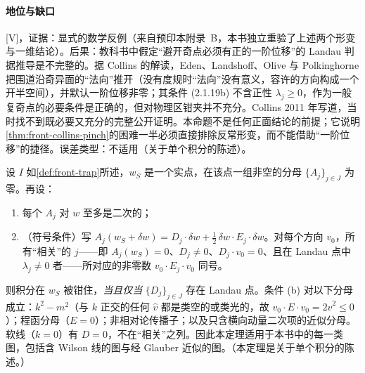 \paragraph{地位与缺口}[V]，证据：显式的数学反例（来自预印本\cite{Collins:2020euz}附录~B，本书独立重验了上述两个形变与一维结论）。后果：教科书中假定“避开奇点必须有正的一阶位移”的 Landau 判据推导是不完整的。据 Collins 的解读\cite[第~IV~节]{Collins:2020euz}，Eden、Landshoff、Olive 与 Polkinghorne\cite[第~2.1~节]{EdenEtAl1966}把围道沿奇异面的“法向”推开（没有度规时“法向”没有意义，容许的方向构成一个开半空间），并默认一阶位移非零；其条件 (2.1.19b) 不含正性 $\lambda_j\ge0$，作为一般复奇点的必要条件是正确的，但对物理区钳夹并不充分。Collins 2011 年写道，当时找不到既必要又充分的完整公开证明\cite[第~5.4.3~节]{Collins2011}。本命题不是任何正面结论的前提；它说明\cref{thm:front-collins-pinch}的困难一半必须直接排除反常形变，而不能借助“一阶位移”的捷径。误差类型：不适用（关于单个积分的陈述）。

\begin{theorem}\label{thm:front-collins-pinch}
设 $I$ 如\cref{def:front-trap}所述，$w_S$ 是一个实点，在该点一组非空的分母 $\{A_j\}_{j\in J}$ 为零。再设：
\begin{enumerate}[label=(\alph*),leftmargin=2.2em,itemsep=0pt,topsep=2pt]
\item 每个 $A_j$ 对 $w$ 至多是二次的；
\item （符号条件）写 $A_j(w_S+\delta w)=D_j\cdot\delta w+\frac12\,\delta w\cdot E_j\cdot\delta w$。对每个方向 $v_0$，所有“相关”的 $j$——即 $A_j(w_S)=0$、$D_j\ne0$、$D_j\cdot v_0=0$、且在 Landau 点中 $\lambda_j\neq0$ 者——所对应的非零数 $v_0\cdot E_j\cdot v_0$ 同号。
\end{enumerate}
则积分在 $w_S$ 被钳住，\emph{当且仅当} $\{D_j\}_{j\in J}$ 存在 Landau 点。条件 (b) 对以下分母成立：$k^2-m^2$（与 $k$ 正交的任何 $\hat v$ 都是类空的或类光的，故 $v_0\cdot E\cdot v_0=2\hat v^2\le0$）；程函分母（$E=0$）；非相对论传播子；以及只含横向动量二次项的近似分母。软线（$k=0$）有 $D=0$，不在“相关”之列。因此本定理适用于本书中的每一类图，包括含 Wilson 线的图与经 Glauber 近似的图。（本定理是关于单个积分的陈述。）
\end{theorem}

